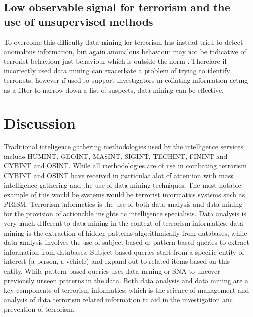 \subsection{Low observable signal for terrorism and the use of unsupervised methods}

To overcome this difficulty data mining for terrorism has instead tried to detect anomalous information, but again anomalous behaviour may not be indicative of terrorist behaviour just behaviour which is outside the norm \citep{thuraisingham2004data}. Therefore if incorrectly used data mining can exacerbate a problem of trying to identify terrorists, however if used to support investigators in collating information acting as a filter to narrow down a list of suspects, data mining can be effective.

\section{Discussion}

Traditional inteligence gathering methodologies used by the intelligence services include  HUMINT, GEOINT, MASINT, SIGINT, TECHINT, FININT and CYBINT and OSINT. While all methodologies are of use in combating terrorism CYBINT and OSINT have received in particular alot of attention with mass intelligence gathering and the use of data mining techniques. 
The most notable example of this would be systems would be terrorist informatics systems such as PRISM. Terrorism informatics is the use of both data analysis and data mining for the provision of actionable insights to intelligence specialists. Data analysis is very much different to data mining in the context of terrorism informatics, data mining is the extraction of hidden patterns algorithmically from databases, while data analysis involves the use of subject based or pattern based queries to extract information from databases. Subject based queries start from a specific entity of interest (a person, a vehicle) and expand out to related items based on this entity. While pattern based queries uses data-mining or SNA to uncover previously unseen patterns in the data. Both data analysis and data mining are a key components of terrorism informatics,  which is the science of management and analysis of data terrorism related information to aid in the investigation and prevention of terrorism.

